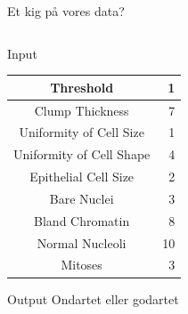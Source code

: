 \documentclass[12pt,t]{beamer}
\begin{document}
    \begin{frame}[c]{Et kig på vores data?}
        \begin{columns}
            \begin{column}{0.6\textwidth}
                \vspace{-1.8em}
                \begin{block}{Input}
                    \begin{center}
                        \begin{tabular}{| c | r |}
                            \hline
                            Threshold                & 1           \\ \hline
                            Clump Thickness          & 7           \\ \hline
                            Uniformity of Cell Size  & 1           \\ \hline
                            Uniformity of Cell Shape & 4           \\ \hline
                            Epithelial Cell Size     & 2           \\ \hline
                            Bare Nuclei              & 3           \\ \hline
                            Bland Chromatin          & 8           \\ \hline
                            Normal Nucleoli          & 10          \\ \hline
                            Mitoses                  & 3           \\ \hline
                        \end{tabular}
                    \end{center}
                \end{block}
                \vspace{-1.2em}
                \begin{block}{Output}
                    \centering Ondartet eller godartet
                \end{block}
            \end{column}
            \pause


\end{columns}
\end{frame}
\end{document}
